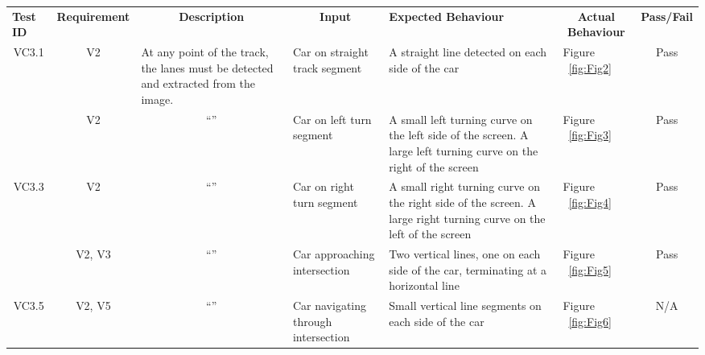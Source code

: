 \documentclass [10pt]{article}
\begin{document}
\begin{longtable}{ | p{ } | p{ } |  p{ } |  p{ } | p{ } | p{ } |  p{ } |}  \hline

    \rowcolor{subsectionC}\textbf{Test ID} 
    & \multicolumn{1}{c|}{\textbf{Requirement} }
    & \multicolumn{1}{c|}{\textbf{Description} }
    & \multicolumn{1}{c|}{\textbf{Input} }
    & \textbf{Expected Behaviour} 
    & \multicolumn{1}{c|}{\textbf{Actual Behaviour} }
    & \textbf{Pass/Fail} \\  
    
    \multicolumn{1}{|c|}{VC3.1} 
    & \multicolumn{1}{c|}{V2}
    & At any point of the track, the lanes must be detected and extracted from the image.
    & Car on straight track segment
    & A straight line detected on each side of the car
    & Figure ~\ref{fig:Fig2}
    & \multicolumn{1}{c|}{Pass}\\  \hline
    
    
    \rowcolor{tableCell}\multicolumn{1}{|c|}{VC3.2} 
    & \multicolumn{1}{c|}{V2}
    & \multicolumn{1}{c|}{``''}
    & Car on left turn segment
    & A small left turning curve on the left side of the screen. A large left turning curve on the right of the screen 
    & Figure ~\ref{fig:Fig3}
    & \multicolumn{1}{c|}{Pass}\\ \hline
    
    
    \multicolumn{1}{|c|}{VC3.3} 
    & \multicolumn{1}{c|}{V2}
    & \multicolumn{1}{c|}{``''}
    & Car on right turn segment
    & A small right turning curve on the right side of the screen. A large right turning curve on the left of the screen 
    & Figure ~\ref{fig:Fig4}
    & \multicolumn{1}{c|}{Pass}\\ \hline
     
     
    \rowcolor{tableCell}\multicolumn{1}{|c|}{VC3.4} 
    &\multicolumn{1}{c|}{ V2, V3}
    & \multicolumn{1}{c|}{``''}
    & Car approaching intersection
    & Two vertical lines, one  on each side of the car, terminating at a horizontal line 
    & Figure ~\ref{fig:Fig5}
    & \multicolumn{1}{c|}{Pass}\\ \hline
    
    
    \multicolumn{1}{|c|}{VC3.5} 
    & \multicolumn{1}{c|}{V2, V5}
    & \multicolumn{1}{c|}{``''}
    & Car navigating through intersection
    & Small vertical line segments on each side of the car
    & Figure ~\ref{fig:Fig6}
    & \multicolumn{1}{c|}{N/A}\\ \hline
    

\end{longtable}
\end{document}
